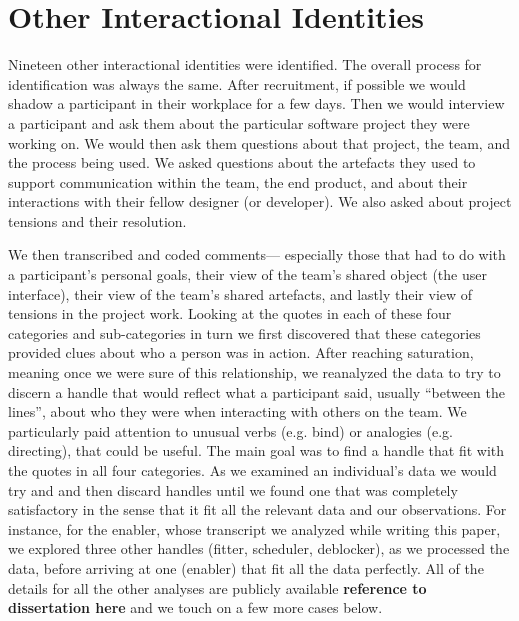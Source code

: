 \documentclass{chi2009}
\begin{document}
\section{Other Interactional Identities}

Nineteen other interactional identities were identified.  The overall process for identification was always the same.  After recruitment, if possible we would shadow a participant in their workplace for a few days.  Then we would interview a participant and ask them about the particular software project they were working on.  We would then ask them questions about that project, the team, and the process being used. We asked questions about the artefacts they used to support communication within the team, the end product, and about their interactions with their fellow designer (or developer).  We also asked about project tensions and their resolution. 

We then transcribed and coded comments--- especially those that had to do with a participant's personal goals, their view of the team's shared object (the user interface), their view of the team's shared artefacts, and lastly their view of tensions in the project work.  Looking at the quotes in each of these four categories and sub-categories in turn we first discovered that these categories provided clues about who a person was in action.  After reaching saturation, meaning once we were sure of this relationship, we reanalyzed the data to try to discern a handle that would reflect what a participant said, usually ``between the lines'', about who they were when interacting with others on the team.  We particularly paid attention to unusual verbs (e.g. bind) or analogies (e.g. directing), that could be useful.  The main goal was to find a handle that fit with the quotes in all four categories.  As we examined an individual's data we would try and and then discard handles until we found one that was completely satisfactory in the sense that it fit all the relevant data and our observations. For instance, for the enabler, whose transcript we analyzed while writing this paper, we explored three other handles (fitter, scheduler, deblocker), as we processed the data, before arriving at one (enabler) that fit all the data perfectly.  All of the details for all the other analyses are publicly available {\bf reference to dissertation here} and we touch on a few more cases below. 
\end{document}
